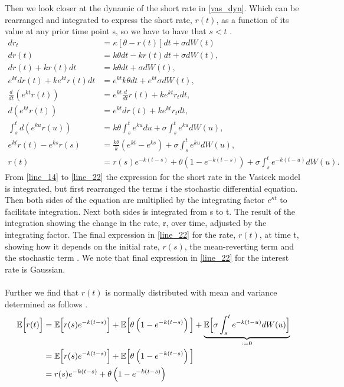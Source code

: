 \noindent
\newpage
\noindent
Then we look closer at the dynamic of the short rate in \autoref{vas_dyn}. Which can be rearranged and integrated
to express the short rate, $r(t)$, as a function of its value at any prior time point s, 
so we have to have that $s < t$ \cite{Bermudan}. 
\begin{align}
    d r_t &= \kappa \left[\theta - r(t)\right] dt + \sigma d W(t) \label{line_14} \\
    d r(t) &= k \theta dt - k r(t) dt + \sigma d W(t),  \\
    d r(t) + k r(t) dt &= k \theta dt + \sigma d W(t), \\
    e^{kt} d r(t) + k e^{kt} r(t) dt &= e^{kt} k \theta dt + e^{kt} \sigma d W(t), \\
    \frac{d}{dt} \left( e^{k t} r(t) \right) &= e^{k t} \frac{d}{dt} r(t) + k e^{k t} r_t dt, \\
    d\left( e^{k t} r(t) \right) &= e^{k t} dr(t) + k e^{k t} r_t dt, \\
    \int_s^t d \left( e^{ku} r(u) \right) &= k \theta \int_s^t e^{ku} du + \sigma \int_s^t e^{ku} d W(u), \\
    e^{kt} r(t) - e^{k s} r(s) &= \frac{k \theta}{k} \left( e^{kt} - e^{ks} \right) + \sigma \int_s^t e^{ku} d W(u), \\
    r(t) &= r(s) e^{-k(t-s)} + \theta \left( 1 - e^{-k(t-s)} \right) + \sigma \int_s^t e^{-k(t-u)} d W(u). \label{line_22}
\end{align}
From \autoref{line_14} to \autoref{line_22} the expression for the short rate in the Vasicek model is integrated, but first
rearranged the terms i the stochastic differential equation. Then both sides of the equation are multiplied by the 
integrating factor $e^{\kappa t}$ to facilitate integration. Next both sides is integrated from s to t. The result of the
integration showing the change in the  rate, r, over time, adjusted by the integrating factor. The final 
expression in \autoref{line_22} for the  rate, $r(t)$, at time t, showing how it depends on the initial rate, $r(s)$,
the mean-reverting term and the stochastic term \cite{Bermudan}. We note that  final expression in \autoref{line_22} for the interest rate
is Gaussian.
\\\\
Further we find that $r(t)$ is normally distributed with mean and variance determined as follows \cite{Bjork}. 
\begin{align*}
    \mathbb{E} \Big[r(t)\Big] & = \mathbb{E} \Big[ r(s) e^{-k(t-s)} \Big] + \mathbb{E} \Big[\theta \left( 1 - e^{-k(t-s)} \right)\Big]
    + \underset{:=0}{\underbrace{\mathbb{E} \Big[\sigma \int_s^t e^{-k(t-u)} d W(u)\Big] }}\\
    & = \mathbb{E} \Big[ r(s) e^{-k(t-s)} \Big] + \mathbb{E} \Big[\theta \left( 1 - e^{-k(t-s)} \right)\Big] \\
    & = r(s) e^{-k(t-s)} + \theta \left( 1 - e^{-k(t-s)} \right) 
\end{align*}    
